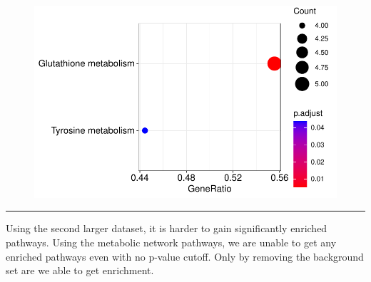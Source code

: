 \documentclass[
  24px,
  letterpaper,
  DIV=11,
  numbers=noendperiod]{scrartcl}
\newenvironment{Shaded}{\begin{snugshade}}{\end{snugshade}}
\newcommand{\AttributeTok}[1]{\textcolor[rgb]{0.40,0.45,0.13}{#1}}
\newcommand{\FunctionTok}[1]{\textcolor[rgb]{0.28,0.35,0.67}{#1}}
\newcommand{\NormalTok}[1]{\textcolor[rgb]{0.00,0.23,0.31}{#1}}
\newcommand{\OtherTok}[1]{\textcolor[rgb]{0.00,0.23,0.31}{#1}}
\newcommand{\SpecialCharTok}[1]{\textcolor[rgb]{0.37,0.37,0.37}{#1}}
\begin{document}
\begin{figure}[H]

{\centering \includegraphics{index_files/figure-pdf/unnamed-chunk-18-1.pdf}

}

\end{figure}

\begin{center}\rule{0.5\linewidth}{0.5pt}\end{center}

Using the second larger dataset, it is harder to gain significantly
enriched pathways. Using the metabolic network pathways, we are unable
to get any enriched pathways even with no p-value cutoff. Only by
removing the background set are we able to get enrichment.

\begin{Shaded}
\end{Shaded}
\end{document}
